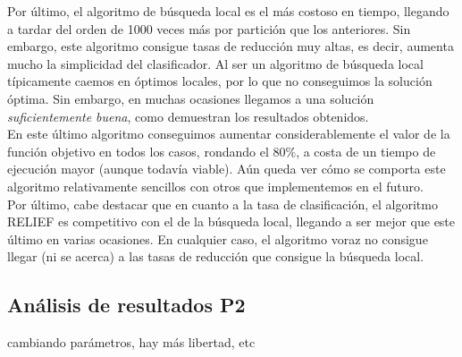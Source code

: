 \documentclass[12pt]{article}
\begin{document}
Por último, el algoritmo de búsqueda local es el más costoso en tiempo, llegando a tardar del orden de 1000 veces más por partición que los anteriores. Sin embargo, este algoritmo consigue tasas de reducción muy altas, es decir, aumenta mucho la simplicidad del clasificador. Al ser un algoritmo de búsqueda local típicamente caemos en óptimos locales, por lo que no conseguimos la solución óptima. Sin embargo, en muchas ocasiones llegamos a una solución \textit{suficientemente buena}, como demuestran los resultados obtenidos.\\

En este último algoritmo conseguimos aumentar considerablemente el valor de la función objetivo en todos los casos, rondando el 80$\%$, a costa de un tiempo de ejecución mayor (aunque todavía viable). Aún queda ver cómo se comporta este algoritmo relativamente sencillos con otros que implementemos en el futuro.\\

Por último, cabe destacar que en cuanto a la tasa de clasificación, el algoritmo RELIEF es competitivo con el de la búsqueda local, llegando a ser mejor que este último en varias ocasiones. En cualquier caso, el algoritmo voraz no consigue llegar (ni se acerca) a las tasas de reducción que consigue la búsqueda local.

\subsection*{Análisis de resultados P2}
\label{analisis}

cambiando parámetros, hay más libertad, etc
\end{document}
